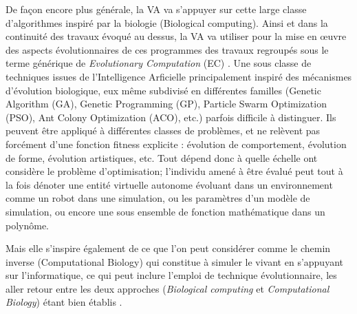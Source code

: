 De façon encore plus générale, la VA va s'appuyer sur cette large classe d'algorithmes inspiré par la biologie (Biological computing). Ainsi et dans la continuité des travaux évoqué au dessus, la VA va utiliser pour la mise en œuvre des aspects évolutionnaires de ces programmes des travaux regroupés sous le terme générique de \textit{Evolutionary Computation} (EC) \autocites{Back1997, Fogel1998, Fogel2006a}. Une sous classe de techniques issues de l'Intelligence Arficielle principalement inspiré des mécanismes d'évolution biologique, eux même subdivisé en différentes familles (Genetic Algorithm (GA), Genetic Programming (GP), Particle Swarm Optimization (PSO), Ant Colony Optimization (ACO), etc.) parfois difficile à distinguer. Ils peuvent être appliqué à différentes classes de problèmes, et ne relèvent pas forcément d'une fonction fitness explicite : évolution de comportement, évolution de forme, évolution artistiques, etc. Tout dépend donc à quelle échelle  ont considère le problème d'optimisation; l'individu amené à être évalué peut tout à la fois dénoter une entité virtuelle autonome évoluant dans un environnement comme un robot dans une simulation, ou les paramètres d'un modèle de simulation, ou encore une sous ensemble de fonction mathématique dans un polynôme.


Mais elle s'inspire également de ce que l'on peut considérer comme le chemin inverse (Computational Biology) qui constitue à simuler le vivant en s'appuyant sur l'informatique, ce qui peut inclure l'emploi de technique évolutionnaire, les aller retour entre les deux approches (\textit{Biological computing} et \textit{Computational Biology}) étant bien établis \autocites{Giavitto2002, Hogeweg1992} .


